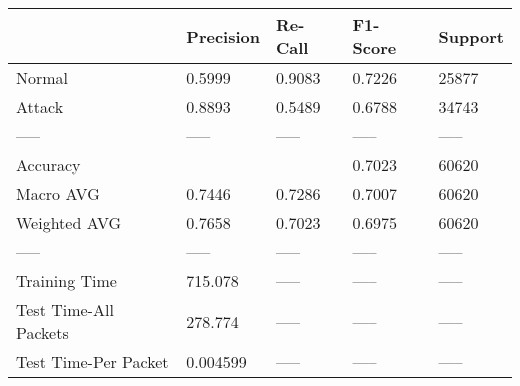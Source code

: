 \begin{tabular}{lllll}
\toprule
{} & Precision & Re-Call & F1-Score & Support \\
\midrule
Normal                &    0.5999 &  0.9083 &   0.7226 &   25877 \\
Attack                &    0.8893 &  0.5489 &   0.6788 &   34743 \\
-----                 &     ----- &   ----- &    ----- &   ----- \\
Accuracy              &           &         &   0.7023 &   60620 \\
Macro AVG             &    0.7446 &  0.7286 &   0.7007 &   60620 \\
Weighted AVG          &    0.7658 &  0.7023 &   0.6975 &   60620 \\
-----                 &     ----- &   ----- &    ----- &   ----- \\
Training Time         &   715.078 &   ----- &    ----- &   ----- \\
Test Time-All Packets &   278.774 &   ----- &    ----- &   ----- \\
Test Time-Per Packet  &  0.004599 &   ----- &    ----- &   ----- \\
\bottomrule
\end{tabular}
